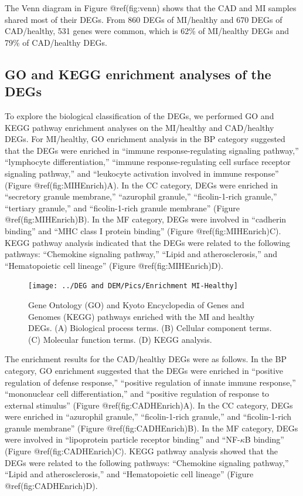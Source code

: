 \documentclass[
]{article}
\begin{document}
The Venn diagram in Figure @ref(fig:venn) shows that the CAD and MI
samples shared most of their DEGs. From 860 DEGs of MI/healthy and 670
DEGs of CAD/healthy, 531 genes were common, which is 62\% of MI/healthy
DEGs and 79\% of CAD/healthy DEGs.

\hypertarget{go-and-kegg-enrichment-analyses-of-the-degs}{%
\subsection{GO and KEGG enrichment analyses of the
DEGs}\label{go-and-kegg-enrichment-analyses-of-the-degs}}

To explore the biological classification of the DEGs, we performed GO
and KEGG pathway enrichment analyses on the MI/healthy and CAD/healthy
DEGs. For MI/healthy, GO enrichment analysis in the BP category
suggested that the DEGs were enriched in ``immune response-regulating
signaling pathway,'' ``lymphocyte differentiation,'' ``immune
response-regulating cell surface receptor signaling pathway,'' and
``leukocyte activation involved in immune response'' (Figure
@ref(fig:MIHEnrich)A). In the CC category, DEGs were enriched in
``secretory granule membrane,'' ``azurophil granule,'' ``ficolin-1-rich
granule,'' ``tertiary granule,'' and ``ficolin-1-rich granule membrane''
(Figure @ref(fig:MIHEnrich)B). In the MF category, DEGs were involved in
``cadherin binding'' and ``MHC class I protein binding'' (Figure
@ref(fig:MIHEnrich)C). KEGG pathway analysis indicated that the DEGs
were related to the following pathways: ``Chemokine signaling pathway,''
``Lipid and atherosclerosis,'' and ``Hematopoietic cell lineage''
(Figure @ref(fig:MIHEnrich)D).

\begin{figure}
\texttt{[image: ../DEG and DEM/Pics/Enrichment MI-Healthy]} \caption{Gene Ontology (GO) and Kyoto Encyclopedia of Genes and Genomes (KEGG) pathways enriched with the MI and healthy DEGs. (A) Biological process terms. (B) Cellular component terms. (C) Molecular function terms. (D) KEGG analysis.}\label{fig:MIHEnrich}
\end{figure}

The enrichment results for the CAD/healthy DEGs were as follows. In the
BP category, GO enrichment suggested that the DEGs were enriched in
``positive regulation of defense response,'' ``positive regulation of
innate immune response,'' ``mononuclear cell differentiation,'' and
``positive regulation of response to external stimulus'' (Figure
@ref(fig:CADHEnrich)A). In the CC category, DEGs were enriched in
``azurophil granule,'' ``ficolin-1-rich granule,'' and ``ficolin-1-rich
granule membrane'' (Figure @ref(fig:CADHEnrich)B). In the MF category,
DEGs were involved in ``lipoprotein particle receptor binding'' and
``NF-\(\kappa\)B binding'' (Figure @ref(fig:CADHEnrich)C). KEGG pathway
analysis showed that the DEGs were related to the following pathways:
``Chemokine signaling pathway,'' ``Lipid and atherosclerosis,'' and
``Hematopoietic cell lineage'' (Figure @ref(fig:CADHEnrich)D).
\end{document}
